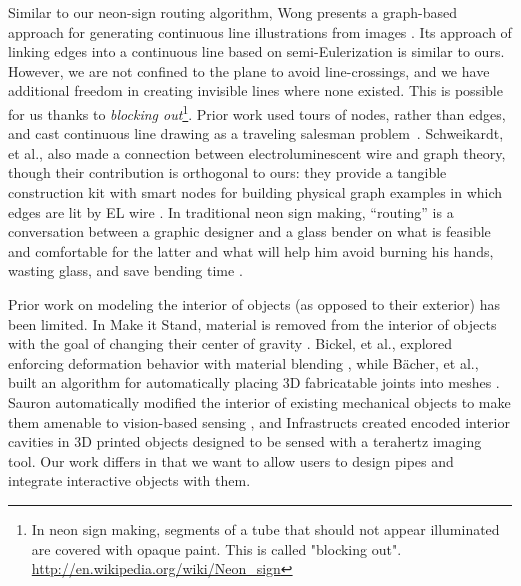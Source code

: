 Similar to our neon-sign routing algorithm, Wong presents a graph-based approach for generating continuous line illustrations from images \cite{Wong-continuousline}. Its approach of linking edges into a continuous line based on semi-Eulerization is similar to ours.  However, we are not confined to the plane to avoid line-crossings, and we have additional freedom in creating invisible lines where none existed.  This is possible for us thanks to \emph{blocking out}\footnote{In neon sign making, segments of a tube that should not appear illuminated are covered with opaque paint. This is called "blocking out". \url{http://en.wikipedia.org/wiki/Neon_sign}}. Prior work used tours of nodes, rather than edges, and cast continuous line drawing as a traveling salesman problem~\cite{Bosch-tsp}.  Schweikardt, et al., also made a connection between electroluminescent wire and graph theory, though their contribution is orthogonal to ours: they provide a tangible construction kit with smart nodes for building physical graph examples in which edges are lit by EL wire \cite{Schweikardt-tei09}.  In traditional neon sign making, ``routing'' is a conversation between a graphic designer and a glass bender on what is feasible and comfortable for the latter and what will help him avoid burning his hands, wasting glass, and save bending time \cite{strattman1997neon}.


Prior work on modeling the interior of objects (as opposed to their exterior) has been limited.  In Make it Stand, material is removed from the interior of objects with the goal of changing their center of gravity \cite{Prevost-makeitstand}.  Bickel, et al., explored enforcing deformation behavior with material blending \cite{Bickel-deformation}, while B\"{a}cher, et al., built an algorithm for automatically placing 3D fabricatable joints into meshes \cite{Bacher-articulated}.  Sauron automatically modified the interior of existing mechanical objects to make them amenable to vision-based sensing \cite{Savage-sauron}, and Infrastructs created encoded interior cavities in 3D printed objects designed to be sensed with a terahertz imaging tool.  Our work differs in that we want to allow users to design pipes and integrate interactive objects with them.